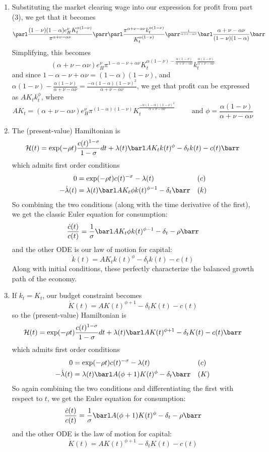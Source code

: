 \documentclass[10pt]{article}
\begin{document}
\begin{enumerate}
	\item Substituting the market clearing wage into our expression for profit from part (3), we get that it becomes\[\parl \frac{(1-\nu)(1-\alpha)e_H^\nu K_t^{\alpha(1-\nu)}}{\pi^{\alpha+\nu-\alpha\nu}}\parr \parl \frac{\pi^{\alpha + \nu - \alpha\nu}k_t^{\alpha(1-\nu)}}{K_t^{\alpha(1-\nu)}}\parr^{\frac{1}{\alpha + \nu - \alpha\nu}} \barl \frac{\alpha + \nu - \alpha\nu}{(1-\nu)(1-\alpha)}\barr\]Simplifying, this becomes\[(\alpha + \nu - \alpha\nu)e_H^\nu \pi^{1 - \alpha - \nu + \alpha\nu}K_t^{\alpha(1-\nu) - \frac{\alpha(1-\nu)}{\alpha + \nu - \alpha\nu}}k_t^{\frac{\alpha(1-\nu)}{\alpha + \nu -\alpha\nu}}\]and since $1-\alpha - \nu + \alpha\nu = (1-\alpha)(1-\nu)$, and $\alpha(1-\nu) - \frac{\alpha(1-\nu)}{\alpha + \nu - \alpha\nu} = \frac{-\alpha(1-\alpha)(1-\nu)^2}{\alpha+\nu-\alpha\nu}$, we get that profit can be expressed as $AK_tk_t^\phi$, where \[AK_t = (\alpha + \nu - \alpha\nu)e_H^\nu \pi^{(1-\alpha)(1-\nu)}K_t^{\frac{-\alpha(1-\alpha)(1-\nu)^2}{\alpha+\nu-\alpha\nu}}\qquad \text{ and } \phi = \frac{\alpha(1-\nu)}{\alpha + \nu - \alpha\nu}\]
	\item The (present-value) Hamiltonian is\[\mathcal{H}(t) = \exp(-\rho t) \frac{c(t)^{1-\sigma}}{1-\sigma}dt + \lambda(t)\barl AK_tk(t)^\phi - \delta_t k(t) - c(t)\barr\]which admits first order conditions \begin{align*} 0 &= \exp(-\rho t)c(t)^{-\sigma} - \lambda(t) &&(c) \\-\dot{\lambda}(t) &= \lambda(t) \barl AK_t \phi k(t)^{\phi - 1} - \delta_t\barr &&(k)\end{align*}So combining the two conditions (along with the time derivative of the first), we get the classic Euler equation for consumption:\[\frac{\dot{c}(t)}{c(t)} = \frac{1}{\sigma}\barl AK_t \phi k(t)^{\phi-1} - \delta_t - \rho\barr\]and the other ODE is our law of motion for capital: \[\dot{k}(t) = AK_t k(t)^{\phi} - \delta_t k(t) - c(t)\]Along with initial conditions, these perfectly characterize the balanced growth path of the economy. 
	\item If $k_t = K_t$, our budget constraint becomes\[\dot{K}(t) = AK(t)^{\phi+1} - \delta_t K(t) - c(t)\]so the (present-value) Hamiltonian is\[\mathcal{H}(t) = \exp(-\rho t) \frac{c(t)^{1-\sigma}}{1-\sigma}dt + \lambda(t)\barl AK(t)^{\phi+1} - \delta_t K(t) - c(t)\barr\]which admits first order conditions \begin{align*} 0 &= \exp(-\rho t)c(t)^{-\sigma} - \lambda(t) &&(c) \\-\dot{\lambda}(t) &= \lambda(t) \barl A(\phi+1)K(t)^\phi - \delta_t\barr &&(K)\end{align*}So again combining the two conditions and differentiating the first with respect to $t$, we get the Euler equation for consumption:\[\frac{\dot{c}(t)}{c(t)} = \frac{1}{\sigma} \barl A(\phi+1)K(t)^\phi - \delta_t - \rho\barr\]and the other ODE is the law of motion for capital:\[\dot{K}(t) = AK(t)^{\phi+1} - \delta_t K(t) - c(t)\]

\end{enumerate}
\end{document}
